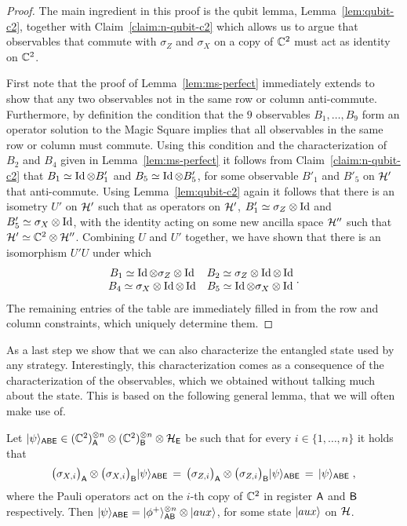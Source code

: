 \begin{proof}
The main ingredient in this proof is the qubit lemma, Lemma~\ref{lem:qubit-c2}, together with Claim~\ref{claim:n-qubit-c2} which allows us to argue that observables that commute with $\sigma_Z$ and $\sigma_X$ on a copy of $\mathbb{C}^2$ must act as identity on $\mathbb{C}^2$.

First note that the proof of Lemma~\ref{lem:ms-perfect} immediately extends to show that any two observables not in the same row or column anti-commute. Furthermore, by definition the condition that the $9$ observables $B_1,\ldots,B_9$ form an operator solution to the Magic Square implies that all observables in the same row or column must commute. Using this condition and the characterization of $B_2$ and $B_4$ given in Lemma~\ref{lem:ms-perfect} it follows from Claim~\ref{claim:n-qubit-c2} that $B_1 \simeq \mathop{\rm Id}\nolimits \otimes B'_1$ and $B_5 \simeq \mathop{\rm Id}\nolimits \otimes B'_5$, for some observable $B'_1$ and $B'_5$ on $\mathcal{H}'$ that anti-commute. Using Lemma~\ref{lem:qubit-c2} again it follows that there is an isometry  $U'$ on $\mathcal{H}'$ such that as operators on $\mathcal{H}'$, $B'_1 \simeq \sigma_Z \otimes \mathop{\rm Id}\nolimits$ and $B'_5 \simeq \sigma_X\otimes \mathop{\rm Id}\nolimits$, with the identity acting on some new ancilla space $\mathcal{H}''$ such that $\mathcal{H}'\simeq \mathbb{C}^2 \otimes \mathcal{H}''$. Combining $U$ and $U'$ together, we have shown that there is an isomorphism $U'U$ under which
\[ \begin{matrix} B_1 \simeq \mathop{\rm Id}\nolimits\otimes \sigma_Z \otimes \mathop{\rm Id}\nolimits & B_2 \simeq \sigma_Z\otimes \mathop{\rm Id}\nolimits \otimes \mathop{\rm Id}\nolimits \\ B_4 \simeq \sigma_X\otimes \mathop{\rm Id}\nolimits \otimes \mathop{\rm Id}\nolimits & B_5 \simeq \mathop{\rm Id}\nolimits\otimes \sigma_X \otimes \mathop{\rm Id}\nolimits \end{matrix}\;.\]
The remaining entries of the table are immediately filled in from the row and column constraints, which uniquely determine them.
\end{proof}

As a last step we show that we can also characterize the entangled state used by any strategy. Interestingly, this characterization comes as a consequence of the characterization of the observables, which we obtained without talking much about the state. This is based on the following general lemma, that we will often make use of. 

\begin{lemma}\label{lem:epr-stable}
Let $|\psi\rangle_{{\textsf{ABE}}} \in (\mathbb{C}^2)_{\textsf{A}}^{\otimes n} \otimes (\mathbb{C}^2)_{\textsf{B}}^{\otimes n} \otimes \mathcal{H}_{\textsf{E}}$ be such that for every $i\in \{1,\ldots, n\}$ it holds that 
\[\big(\sigma_{X,i}\big)_{\textsf{A}} \otimes \big(\sigma_{X,i}\big)_{\textsf{B}} |\psi\rangle_{{\textsf{ABE}}} \,=\, \big(\sigma_{Z,i}\big)_{\textsf{A}} \otimes \big(\sigma_{Z,i}\big)_{\textsf{B}} |\psi\rangle_{{\textsf{ABE}}} \,=\,|\psi\rangle_{\textsf{ABE}}\;,\]
where the Pauli operators act on the $i$-th copy of $\mathbb{C}^2$ in register ${\textsf{A}}$ and ${\textsf{B}}$ respectively. Then $|\psi\rangle_{{\textsf{ABE}}} = |\phi^+\rangle^{\otimes n}_{{\textsf{AB}}} \otimes |aux\rangle$, for some state $|aux\rangle$ on $\mathcal{H}$. 
\end{lemma}

